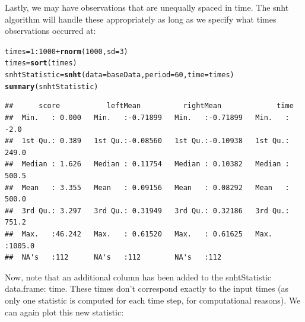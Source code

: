 \documentclass[nojss]{jss}\usepackage[]{graphicx}\usepackage[]{color}
\makeatletter
\newcommand{\hlnum}[1]{\textcolor[rgb]{0.686,0.059,0.569}{#1}}%
\newcommand{\hlopt}[1]{\textcolor[rgb]{0,0,0}{#1}}%
\newcommand{\hlstd}[1]{\textcolor[rgb]{0.345,0.345,0.345}{#1}}%
\newcommand{\hlkwb}[1]{\textcolor[rgb]{0.69,0.353,0.396}{#1}}%
\newcommand{\hlkwc}[1]{\textcolor[rgb]{0.333,0.667,0.333}{#1}}%
\newcommand{\hlkwd}[1]{\textcolor[rgb]{0.737,0.353,0.396}{\textbf{#1}}}%
\newenvironment{kframe}{%
 \def\at@end@of@kframe{}%
 \ifinner\ifhmode%
  \def\at@end@of@kframe{\end{minipage}}%
  \begin{minipage}{\columnwidth}%
 \fi\fi%
 \def\FrameCommand##1{\hskip\@totalleftmargin \hskip-\fboxsep
 \colorbox{shadecolor}{##1}\hskip-\fboxsep
     \hskip-\linewidth \hskip-\@totalleftmargin \hskip\columnwidth}%
 \MakeFramed {\advance\hsize-\width
   \@totalleftmargin\z@ \linewidth\hsize
   \@setminipage}}%
 {\par\unskip\endMakeFramed%
 \at@end@of@kframe}
\newenvironment{knitrout}{}{} %
\makeatother
\begin{document}
Lastly, we may have observations that are unequally spaced in time.  The snht algorithm will handle these appropriately as long as we specify what times observations occurred at:

\begin{knitrout}
\color{fgcolor}\begin{kframe}
\begin{alltt}
\hlstd{times} \hlkwb{=} \hlnum{1}\hlopt{:}\hlnum{1000} \hlopt{+} \hlkwd{rnorm}\hlstd{(}\hlnum{1000}\hlstd{,} \hlkwc{sd} \hlstd{=} \hlnum{3}\hlstd{)}
\hlstd{times} \hlkwb{=} \hlkwd{sort}\hlstd{(times)}
\hlstd{snhtStatistic} \hlkwb{=} \hlkwd{snht}\hlstd{(}\hlkwc{data} \hlstd{= baseData,} \hlkwc{period} \hlstd{=} \hlnum{60}\hlstd{,} \hlkwc{time} \hlstd{= times)}
\hlkwd{summary}\hlstd{(snhtStatistic)}
\end{alltt}
\begin{verbatim}
##      score           leftMean          rightMean             time       
##  Min.   : 0.000   Min.   :-0.71899   Min.   :-0.71899   Min.   :  -2.0  
##  1st Qu.: 0.389   1st Qu.:-0.08560   1st Qu.:-0.10938   1st Qu.: 249.0  
##  Median : 1.626   Median : 0.11754   Median : 0.10382   Median : 500.5  
##  Mean   : 3.355   Mean   : 0.09156   Mean   : 0.08292   Mean   : 500.0  
##  3rd Qu.: 3.297   3rd Qu.: 0.31949   3rd Qu.: 0.32186   3rd Qu.: 751.2  
##  Max.   :46.242   Max.   : 0.61520   Max.   : 0.61625   Max.   :1005.0  
##  NA's   :112      NA's   :112        NA's   :112
\end{verbatim}
\end{kframe}
\end{knitrout}

Now, note that an additional column has been added to the snhtStatistic data.frame: time.  These times don't correspond exactly to the input times (as only one statistic is computed for each time step, for computational reasons).  We can again plot this new statistic:
\end{document}

